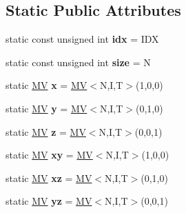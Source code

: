 \subsection*{Static Public Attributes}
\begin{DoxyCompactItemize}
\item 
\hypertarget{classvsr_1_1_m_v_a0b94ef5a06d551749b5cd57a75ac500c}{static const unsigned int {\bfseries idx} = I\-D\-X}\label{classvsr_1_1_m_v_a0b94ef5a06d551749b5cd57a75ac500c}

\item 
\hypertarget{classvsr_1_1_m_v_a68d87f8a2c59e5345bb5ba862a4a5786}{static const unsigned int {\bfseries size} = N}\label{classvsr_1_1_m_v_a68d87f8a2c59e5345bb5ba862a4a5786}

\item 
\hypertarget{classvsr_1_1_m_v_a91086b17d8d96dbbda515145af8b4329}{static \hyperlink{classvsr_1_1_m_v}{M\-V} {\bfseries x} = \hyperlink{classvsr_1_1_m_v}{M\-V}$<$N,I,T$>$(1,0,0)}\label{classvsr_1_1_m_v_a91086b17d8d96dbbda515145af8b4329}

\item 
\hypertarget{classvsr_1_1_m_v_ac361e2dfa95a779b046c098a9f3e1960}{static \hyperlink{classvsr_1_1_m_v}{M\-V} {\bfseries y} = \hyperlink{classvsr_1_1_m_v}{M\-V}$<$N,I,T$>$(0,1,0)}\label{classvsr_1_1_m_v_ac361e2dfa95a779b046c098a9f3e1960}

\item 
\hypertarget{classvsr_1_1_m_v_af16176031660ac7d784d9f880f35a4c7}{static \hyperlink{classvsr_1_1_m_v}{M\-V} {\bfseries z} = \hyperlink{classvsr_1_1_m_v}{M\-V}$<$N,I,T$>$(0,0,1)}\label{classvsr_1_1_m_v_af16176031660ac7d784d9f880f35a4c7}

\item 
\hypertarget{classvsr_1_1_m_v_a3b2bd443158e109ee72fdff7cb054ce4}{static \hyperlink{classvsr_1_1_m_v}{M\-V} {\bfseries xy} = \hyperlink{classvsr_1_1_m_v}{M\-V}$<$N,I,T$>$(1,0,0)}\label{classvsr_1_1_m_v_a3b2bd443158e109ee72fdff7cb054ce4}

\item 
\hypertarget{classvsr_1_1_m_v_ae84ff37e9744d545b274df614dd97fae}{static \hyperlink{classvsr_1_1_m_v}{M\-V} {\bfseries xz} = \hyperlink{classvsr_1_1_m_v}{M\-V}$<$N,I,T$>$(0,1,0)}\label{classvsr_1_1_m_v_ae84ff37e9744d545b274df614dd97fae}

\item 
\hypertarget{classvsr_1_1_m_v_a5fd31990ce96a3db4cd79395bae150a7}{static \hyperlink{classvsr_1_1_m_v}{M\-V} {\bfseries yz} = \hyperlink{classvsr_1_1_m_v}{M\-V}$<$N,I,T$>$(0,0,1)}\label{classvsr_1_1_m_v_a5fd31990ce96a3db4cd79395bae150a7}

\end{DoxyCompactItemize}
